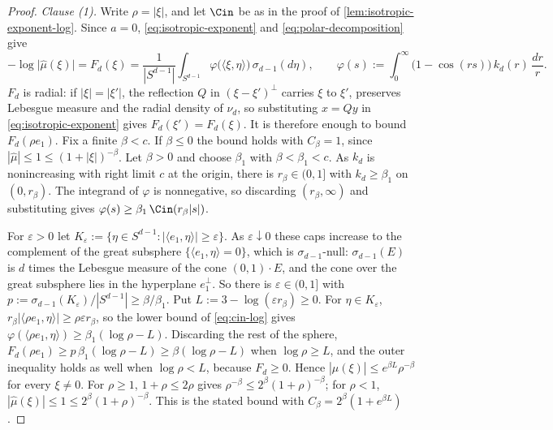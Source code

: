 \begin{proof}
\leanok
\emph{Clause (1).} Write $\rho = |\xi|$, and let $\Cin$ be as in the proof of
\ref{lem:isotropic-exponent-log}. Since $a = 0$, \ref{eq:isotropic-exponent} and
\ref{eq:polar-decomposition} give
\[
  -\log\bigl|\widehat\mu(\xi)\bigr| = F_d(\xi)
   = \frac{1}{|S^{d-1}|}\int_{S^{d-1}}\varphi\bigl(\langle\xi,\eta\rangle\bigr)\,\sigma_{d-1}(d\eta),
  \qquad
  \varphi(s) := \int_0^\infty\bigl(1 - \cos(rs)\bigr)\,k_d(r)\,\frac{dr}{r} .
\]
$F_d$ is radial: if $|\xi| = |\xi'|$, the reflection $Q$ in $(\xi - \xi')^\perp$ carries $\xi$ to
$\xi'$, preserves Lebesgue measure and the radial density of $\nu_d$, so substituting $x = Qy$ in
\ref{eq:isotropic-exponent} gives $F_d(\xi') = F_d(\xi)$. It is therefore enough to bound
$F_d(\rho e_1)$. Fix a finite $\beta < c$. If $\beta \le 0$ the bound holds with $C_\beta = 1$,
since $|\widehat\mu| \le 1 \le (1+|\xi|)^{-\beta}$. Let $\beta > 0$ and choose $\beta_1$ with
$\beta < \beta_1 < c$. As $k_d$ is nonincreasing with right limit $c$ at the origin, there is
$r_\beta \in (0,1]$ with $k_d \ge \beta_1$ on $(0,r_\beta)$. The integrand of $\varphi$ is
nonnegative, so discarding $(r_\beta,\infty)$ and substituting gives
$\varphi(s) \ge \beta_1\,\Cin(r_\beta|s|)$.

For $\varepsilon > 0$ let $K_\varepsilon := \{\eta \in S^{d-1} : |\langle e_1,\eta\rangle| \ge
\varepsilon\}$. As $\varepsilon \downarrow 0$ these caps increase to the complement of the great
subsphere $\{\langle e_1,\eta\rangle = 0\}$, which is $\sigma_{d-1}$-null: $\sigma_{d-1}(E)$ is $d$
times the Lebesgue measure of the cone $(0,1)\cdot E$, and the cone over the great subsphere lies in
the hyperplane $e_1^\perp$. So there is $\varepsilon \in (0,1]$ with
$p := \sigma_{d-1}(K_\varepsilon)/|S^{d-1}| \ge \beta/\beta_1$. Put
$L := 3 - \log(\varepsilon r_\beta) \ge 0$. For $\eta \in K_\varepsilon$,
$r_\beta|\langle\rho e_1,\eta\rangle| \ge \rho\varepsilon r_\beta$, so the lower bound of
\ref{eq:cin-log} gives $\varphi(\langle\rho e_1,\eta\rangle) \ge \beta_1(\log\rho - L)$. Discarding
the rest of the sphere, $F_d(\rho e_1) \ge p\,\beta_1(\log\rho - L) \ge \beta(\log\rho - L)$ when
$\log\rho \ge L$, and the outer inequality holds as well when $\log\rho < L$, because $F_d \ge 0$.
Hence $|\widehat\mu(\xi)| \le e^{\beta L}\rho^{-\beta}$ for every $\xi \ne 0$. For $\rho \ge 1$,
$1 + \rho \le 2\rho$ gives $\rho^{-\beta} \le 2^\beta(1+\rho)^{-\beta}$; for $\rho < 1$,
$|\widehat\mu(\xi)| \le 1 \le 2^\beta(1+\rho)^{-\beta}$. This is the stated bound with
$C_\beta = 2^\beta(1 + e^{\beta L})$.


\end{proof}
